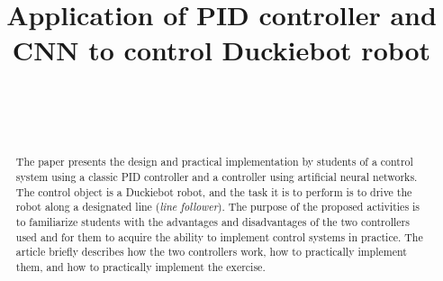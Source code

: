 \documentclass[conference]{IEEEtran}
\begin{document}
%
\title{Application of PID controller and CNN to control Duckiebot robot}


\author{
\\[0.0cm]
\and
{}
\\
}


\maketitle              %

\begin{abstract}
The paper presents the design and practical implementation by students of a control system
using a classic PID controller and a controller using artificial neural networks.
The control object is a Duckiebot robot, and the task it is to perform is to drive the robot along a designated line (\emph{line follower}). The purpose of the proposed activities is to familiarize students with the advantages and disadvantages of the two controllers used and for them to acquire the ability to implement control systems in practice. 
The article briefly describes how the two controllers work, how to practically implement them, and how to practically implement the exercise.
\end{abstract}
\end{document}
